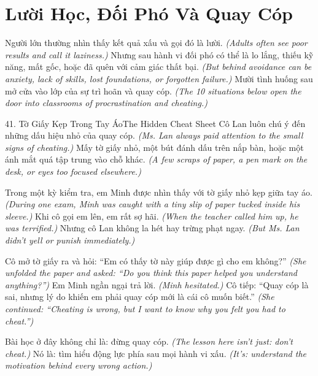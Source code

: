 \chapter{Lười Học, Đối Phó Và Quay Cóp}

\begin{leadbox}
Người lớn thường nhìn thấy kết quả xấu và gọi đó là lười.
\textit{(Adults often see poor results and call it laziness.)}
Nhưng sau hành vi đối phó có thể là lo lắng, thiếu kỹ năng, mất gốc, hoặc đã quên với cảm giác thất bại.
\textit{(But behind avoidance can be anxiety, lack of skills, lost foundations, or forgotten failure.)}
Mười tình huống sau mở cửa vào lớp của sự trì hoãn và quay cóp.
\textit{(The 10 situations below open the door into classrooms of procrastination and cheating.)}
\end{leadbox}

\begin{truyen}{41. Tờ Giấy Kẹp Trong Tay Áo}{The Hidden Cheat Sheet}
Cô Lan luôn chú ý đến những dấu hiệu nhỏ của quay cóp.
\textit{(Ms. Lan always paid attention to the small signs of cheating.)}
Mấy tờ giấy nhỏ, một bút đánh dấu trên nắp bàn, hoặc một ánh mắt quá tập trung vào chỗ khác.
\textit{(A few scraps of paper, a pen mark on the desk, or eyes too focused elsewhere.)}

Trong một kỳ kiểm tra, em Minh được nhìn thấy với tờ giấy nhỏ kẹp giữa tay áo.
\textit{(During one exam, Minh was caught with a tiny slip of paper tucked inside his sleeve.)}
Khi cô gọi em lên, em rất sợ hãi.
\textit{(When the teacher called him up, he was terrified.)}
Nhưng cô Lan không la hét hay trừng phạt ngay.
\textit{(But Ms. Lan didn't yell or punish immediately.)}

Cô mở tờ giấy ra và hỏi: ``Em có thấy tờ này giúp được gì cho em không?''
\textit{(She unfolded the paper and asked: ``Do you think this paper helped you understand anything?'')}
Em Minh ngần ngại trả lời.
\textit{(Minh hesitated.)}
Cô tiếp: ``Quay cóp là sai, nhưng lý do khiến em phải quay cóp mới là cái cô muốn biết.''
\textit{(She continued: ``Cheating is wrong, but I want to know why you felt you had to cheat.'')}

Bài học ở đây không chỉ là: đừng quay cóp.
\textit{(The lesson here isn't just: don't cheat.)}
Nó là: tìm hiểu động lực phía sau mọi hành vi xấu.
\textit{(It's: understand the motivation behind every wrong action.)}
\end{truyen}

